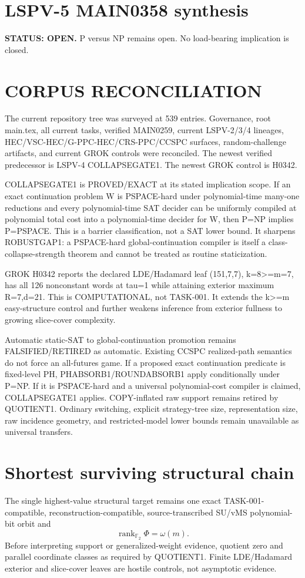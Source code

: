 \documentclass[11pt]{article}
\begin{document}
\section*{LSPV-5 MAIN0358 synthesis}
\textbf{STATUS: OPEN.} P versus NP remains open. No load-bearing implication is closed.

\section*{CORPUS RECONCILIATION}
The current repository tree was surveyed at 539 entries. Governance, root main.tex, all current tasks, verified MAIN0259, current LSPV-2/3/4 lineages, HEC/VSC-HEC/G-PPC-HEC/CRS-PPC/CCSPC surfaces, random-challenge artifacts, and current GROK controls were reconciled. The newest verified predecessor is LSPV-4 COLLAPSEGATE1. The newest GROK control is H0342.

COLLAPSEGATE1 is PROVED/EXACT at its stated implication scope. If an exact continuation problem W is PSPACE-hard under polynomial-time many-one reductions and every polynomial-time SAT decider can be uniformly compiled at polynomial total cost into a polynomial-time decider for W, then P=NP implies P=PSPACE. This is a barrier classification, not a SAT lower bound. It sharpens ROBUSTGAP1: a PSPACE-hard global-continuation compiler is itself a class-collapse-strength theorem and cannot be treated as routine staticization.

GROK H0342 reports the declared LDE/Hadamard leaf (151,7,7), k=8>=m=7, has all 126 nonconstant words at tau=1 while attaining exterior maximum R=7,d=21. This is COMPUTATIONAL, not TASK-001. It extends the k>=m easy-structure control and further weakens inference from exterior fullness to growing slice-cover complexity.

Automatic static-SAT to global-continuation promotion remains FALSIFIED/RETIRED as automatic. Existing CCSPC realized-path semantics do not force an all-futures game. If a proposed exact continuation predicate is fixed-level PH, PHABSORB1/ROUNDABSORB1 apply conditionally under P=NP. If it is PSPACE-hard and a universal polynomial-cost compiler is claimed, COLLAPSEGATE1 applies. COPY-inflated raw support remains retired by QUOTIENT1. Ordinary switching, explicit strategy-tree size, representation size, raw incidence geometry, and restricted-model lower bounds remain unavailable as universal transfers.

\section*{Shortest surviving structural chain}
The single highest-value structural target remains one exact TASK-001-compatible, reconstruction-compatible, source-transcribed SU/vMS polynomial-bit orbit and
\[
\boxed{\operatorname{rank}_{\mathbb F_2}\Phi=\omega(m)}.
\]
Before interpreting support or generalized-weight evidence, quotient zero and parallel coordinate classes as required by QUOTIENT1. Finite LDE/Hadamard exterior and slice-cover leaves are hostile controls, not asymptotic evidence.
\end{document}
